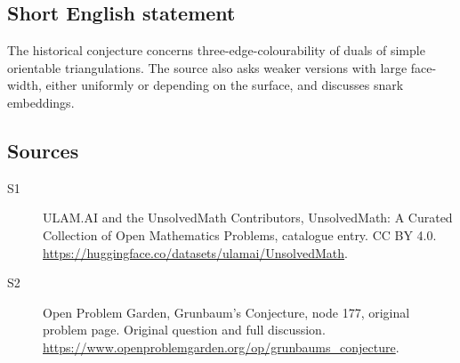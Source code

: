 \documentclass[11pt]{article}
\begin{document}
\subsection{Short English statement}
The historical conjecture concerns three-edge-colourability of duals of simple orientable triangulations. The source also asks weaker versions with large face-width, either uniformly or depending on the surface, and discusses snark embeddings.
\subsection{Sources}
\begin{description}
\item[\hypertarget{source:statement:1}{S1}] ULAM.AI and the UnsolvedMath Contributors, UnsolvedMath: A Curated Collection of Open Mathematics Problems, catalogue entry. CC BY 4.0. \url{https://huggingface.co/datasets/ulamai/UnsolvedMath}.
\item[\hypertarget{source:statement:2}{S2}] Open Problem Garden, Grunbaum's Conjecture, node 177, original problem page. Original question and full discussion. \url{https://www.openproblemgarden.org/op/grunbaums_conjecture}.

\end{description}
\label{end:statement}
\end{document}
